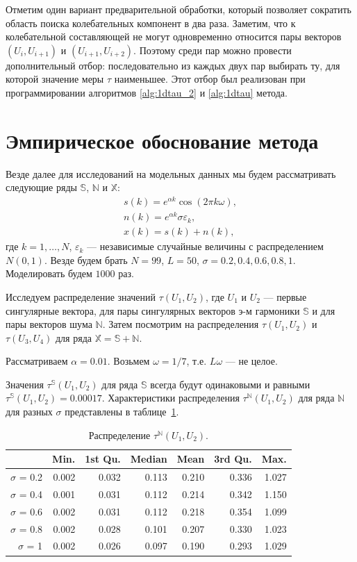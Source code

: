 \documentclass[specialist,
               substylefile = spbu.rtx,
               subf,href,colorlinks=true, 12pt]{disser}
\begin{document}
Отметим один вариант предварительной обработки, который позволяет сократить область поиска колебательных компонент в два раза.
Заметим, что к колебательной составляющей не могут одновременно относится пары векторов $(U_i, U_{i+1})$ и $(U_{i+1}, U_{i+2})$. Поэтому среди пар можно провести дополнительный отбор: последовательно из каждых двух пар выбирать ту, для которой значение меры $\tau$ наименьшее. Этот отбор был реализован при программировании алгоритмов \ref{alg:1dtau_2} и \ref{alg:1dtau} метода. 

\section{Эмпирическое обоснование метода}
\label{sec:tau_study}
Везде далее для исследований на модельных данных мы будем рассматривать следующие ряды $\mathbb{S}$, $\mathbb{N}$ и $\mathbb{X}$:
\begin{gather} \label{eq:series_S_N}
s(k) =  e^{\alpha k} \cos(2\pi k \omega), \\  \label{eq:series_N_N}
n(k) =  e^{\alpha k} \sigma \varepsilon_k, \\ \label{eq:series_X_N}
x(k) = s(k) + n(k),
\end{gather}
где $k=1,\ldots,N$, $\varepsilon_k$ --- независимые случайные величины с распределением $N(0,1)$. Везде будем брать $N = 99$, $L = 50$, $\sigma = 0.2, 0.4, 0.6, 0.8, 1$. Моделировать будем $1000$ раз.

Исследуем распределение
 значений $\tau(U_1, U_2)$, где $U_1$ и $U_2$ --- первые сингулярные вектора, для пары сингулярных векторов э-м гармоники $\mathbb{S}$ и для пары векторов шума $\mathbb{N}$. Затем посмотрим на распределения  $\tau(U_1, U_2)$ и  $\tau(U_3, U_4)$ для ряда $\mathbb{X} = \mathbb{S} + \mathbb{N}$.

Рассматриваем $\alpha = 0.01$. Возьмем $\omega = 1/7$, т.е. $L\omega$ --- не целое.

Значения $\tau^{\mathbb{S}}(U_1, U_2)$  для ряда $\mathbb{S}$ всегда будут одинаковыми и равными  $\tau^{\mathbb{S}}(U_1, U_2) = 0.00017$. Характеристики распределения $\tau^{\mathbb{N}}(U_1, U_2)$ для ряда $\mathbb{N}$ для разных $\sigma$ представлены в таблице~\ref{tab:model_dist_tau1_sig_notint}.

\begin{table}[hhh!]
\caption{Распределение $\tau^{\mathbb{N}}(U_1, U_2)$.}
\centering
\begin{tabular}{rrrrrrr}
  \hline
 & Min. & 1st Qu. & Median & Mean & 3rd Qu. & Max. \\
  \hline
$\sigma$ = 0.2 & 0.002 & 0.032 & 0.113 & 0.210 & 0.336 & 1.027 \\
  $\sigma$ = 0.4 & 0.001 & 0.031 & 0.112 & 0.214 & 0.342 & 1.150 \\
  $\sigma$ = 0.6 & 0.002 & 0.031 & 0.112 & 0.218 & 0.354 & 1.099 \\
  $\sigma$ = 0.8 & 0.002 & 0.028 & 0.101 & 0.207 & 0.330 & 1.023 \\
  $\sigma$ = 1 & 0.002 & 0.026 & 0.097 & 0.190 & 0.293 & 1.029 \\
   \hline
\end{tabular}
\label{tab:model_dist_tau1_sig_notint}
\end{table}
\end{document}
